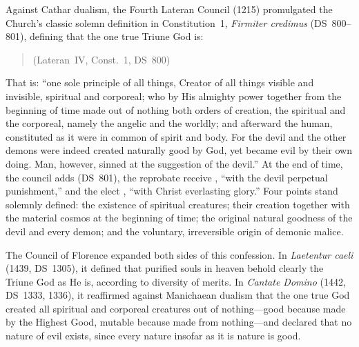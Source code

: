 Against Cathar dualism, the Fourth Lateran Council (1215) promulgated the Church's classic solemn definition in Constitution~1, \emph{Firmiter credimus} (DS~800--801), defining that the one true Triune God is:
\begin{quotation}
 (Lateran~IV, Const.~1, DS~800)
\end{quotation}
That is: ``one sole principle of all things, Creator of all things visible and invisible, spiritual and corporeal; who by His almighty power together from the beginning of time made out of nothing both orders of creation, the spiritual and the corporeal, namely the angelic and the worldly; and afterward the human, constituted as it were in common of spirit and body. For the devil and the other demons were indeed created naturally good by God, yet became evil by their own doing. Man, however, sinned at the suggestion of the devil.'' At the end of time, the council adds (DS~801), the reprobate receive , ``with the devil perpetual punishment,'' and the elect , ``with Christ everlasting glory.'' Four points stand solemnly defined: the existence of spiritual creatures; their creation  together with the material cosmos at the beginning of time; the original natural goodness of the devil and every demon; and the voluntary, irreversible origin of demonic malice.

The Council of Florence expanded both sides of this confession. In \emph{Laetentur caeli} (1439, DS~1305), it defined that purified souls in heaven behold clearly the Triune God as He is, according to diversity of merits. In \emph{Cantate Domino} (1442, DS~1333, 1336), it reaffirmed against Manichaean dualism that the one true God created all spiritual and corporeal creatures out of nothing---good because made by the Highest Good, mutable because made from nothing---and declared that no nature of evil exists, since every nature insofar as it is nature is good.

